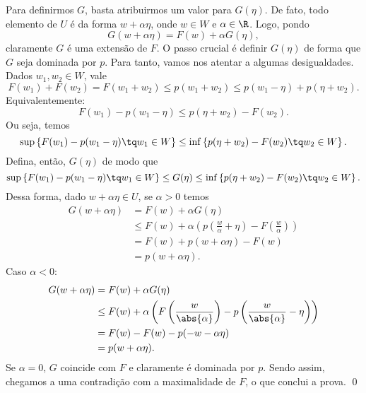 Para definirmos \( G \), basta atribuirmos um valor para \( G(\eta) \).
De fato, todo elemento de \( U \) é da forma \( w + \alpha \eta \), onde \( w \in W \) e \( \alpha \in \R \).
Logo, pondo
\begin{equation}
    G(w + \alpha \eta) = F(w) + \alpha G(\eta)
,\end{equation}
claramente \( G \) é uma extensão de \( F \).
O passo crucial é definir \( G(\eta) \) de forma que \( G \) seja dominada por \( p \).
Para tanto, vamos nos atentar a algumas desigualdades.
Dados \( w_{ 1 }, w_{ 2 } \in W \), vale
\begin{equation}
    F(w_{ 1 }) + F(w_{ 2 }) =
    F(w_{ 1 } + w_{ 2 }) \leq
    p(w_{ 1 } + w_{ 2 }) \leq
    p(w_{ 1 } - \eta) + p(\eta + w_{ 2 })
.\end{equation}
Equivalentemente:
\begin{equation}
    F(w_{ 1 }) - p(w_{ 1 } - \eta) \leq p(\eta + w_{ 2 }) - F(w_{ 2 })
.\end{equation}
Ou seja, temos
\begin{equation}
    \sup \left\{ F(w_{ 1 }) - p(w_{ 1 } - \eta) \tq w_{ 1 } \in W \right\} \leq
    \inf \left\{ p(\eta + w_{ 2 }) - F(w_{ 2 }) \tq w_{ 2 } \in W \right\}
.\end{equation}
Defina, então, \( G(\eta) \) de modo que
\begin{equation}
    \sup \left\{ F(w_{ 1 }) - p(w_{ 1 } - \eta) \tq w_{ 1 } \in W \right\} \leq
    G(\eta) \leq
    \inf \left\{ p(\eta + w_{ 2 }) - F(w_{ 2 }) \tq w_{ 2 } \in W \right\}
.\end{equation}
Dessa forma, dado \( w + \alpha \eta \in U \), se \( \alpha > 0 \) temos
\begin{align}
    G(w + \alpha \eta) &=
    F(w) + \alpha G(\eta) \\
    &\leq F(w) + \alpha \left( 
        p \left( \frac{ w }{ \alpha } + \eta \right) - F \left(  \frac{ w }{ \alpha }  \right)
    \right) \\
    &= F(w) + p(w + \alpha \eta) - F(w) \\
    &= p(w + \alpha \eta)
.\end{align}
Caso \( \alpha < 0 \):
\begin{align}
    G(w + \alpha \eta) &=
    F(w) + \alpha G(\eta) \\
    &\leq F(w) + \alpha \left( 
        F \left( \frac{ w }{ \abs{ \alpha } } \right) -
        p \left( \frac{ w }{ \abs{ \alpha } } - \eta \right)
    \right) \\
    &= F(w) - F(w) - p(-w - \alpha \eta) \\
    &= p(w + \alpha \eta)
.\end{align}
Se \( \alpha = 0 \), \( G \) coincide com \( F \) e claramente é dominada por \( p \).
Sendo assim, chegamos a uma contradição com a maximalidade de \( F \), o que conclui a prova. \qed

